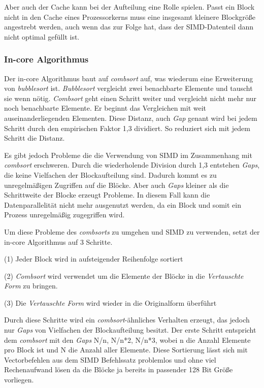 Aber auch der Cache kann bei der Aufteilung eine Rolle spielen. Passt ein Block nicht in den Cache eines Prozessorkerns muss eine insgesamt kleinere Blockgröße angestrebt werden, auch wenn das zur Folge hat, dass der SIMD-Datenteil dann nicht optimal gefüllt ist.

\subsubsection*{In-core Algorithmus}
\label{sec:AA-Sort_In_Core}

Der in-core Algorithmus baut auf \textit{combsort} auf, was wiederum eine Erweiterung von \textit{bubblesort} ist. \textit{Bubblesort} vergleicht zwei benachbarte Elemente und tauscht sie wenn nötig. \textit{Combsort} geht einen Schritt weiter und vergleicht nicht mehr nur noch benachbarte Elemente. Er beginnt das Vergleichen mit weit auseinanderliegenden Elementen. Diese Distanz, auch \textit{Gap} genant wird bei jedem Schritt durch den empirischen Faktor 1,3 dividiert. So reduziert sich mit jedem Schritt die Distanz.

Es gibt jedoch Probleme die die Verwendung von SIMD im Zusammenhang mit \textit{combsort} erschweren. Durch die wiederholende Division durch 1,3 entstehen \textit{Gaps}, die keine Vielfachen der Blockaufteilung sind. Dadurch kommt es zu unregelmäßigen Zugriffen auf die Blöcke. Aber auch \textit{Gaps} kleiner als die Schrittweite der Blocke erzeugt Probleme. In diesem Fall kann die Datenparallelität nicht mehr ausgenutzt werden, da ein Block und somit ein Prozess unregelmäßig zugegriffen wird.

Um diese Probleme des \textit{combsorts} zu umgehen und SIMD zu verwenden, setzt der in-core Algorithmus auf 3 Schritte.


(1) Jeder Block wird in aufsteigender Reihenfolge sortiert

(2) \textit{Combsort} wird verwendet um die Elemente der Blöcke in die \textit{Vertauschte Form} zu bringen.

(3) Die \textit{Vertauschte Form} wird wieder in die Originalform überführt


Durch diese Schritte wird ein \textit{combsort}-ähnliches Verhalten erzeugt, das jedoch nur \textit{Gaps} von Vielfachen der Blockaufteilung besitzt. Der erste Schritt entspricht dem \textit{combsort} mit den \textit{Gaps} N/n, N/n*2, N/n*3, wobei n die Anzahl Elemente pro Block ist und N die Anzahl aller Elemente. Diese Sortierung lässt sich mit Vectorbefehlen aus dem SIMD Befehlssatz problemlos und ohne viel Rechenaufwand lösen da die Blöcke ja bereits in passender 128 Bit Größe vorliegen.

